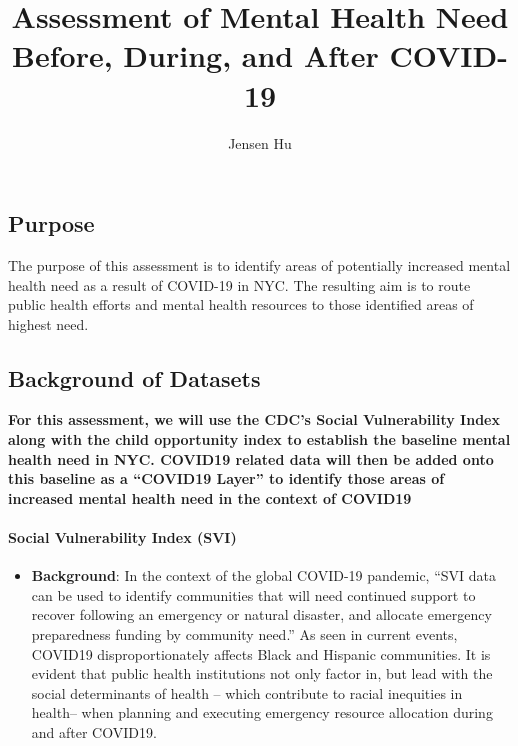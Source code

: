 \documentclass[
]{article}
\title{Assessment of Mental Health Need Before, During, and After COVID-19}
\author{Jensen Hu}
\date{}
\providecommand{\tightlist}{%
  \setlength{\itemsep}{0pt}\setlength{\parskip}{0pt}}
\begin{document}
\maketitle

\hypertarget{purpose}{%
\subsection{Purpose}\label{purpose}}

The purpose of this assessment is to identify areas of potentially
increased mental health need as a result of COVID-19 in NYC. The
resulting aim is to route public health efforts and mental health
resources to those identified areas of highest need.

\hypertarget{background-of-datasets}{%
\subsection{Background of Datasets}\label{background-of-datasets}}

\textbf{For this assessment, we will use the CDC's Social Vulnerability
Index along with the child opportunity index to establish the baseline
mental health need in NYC. COVID19 related data will then be added onto
this baseline as a ``COVID19 Layer'' to identify those areas of
increased mental health need in the context of COVID19}

\hypertarget{social-vulnerability-index-svi}{%
\paragraph{\texorpdfstring{\textbf{Social Vulnerability Index
(SVI)}}{Social Vulnerability Index (SVI)}}\label{social-vulnerability-index-svi}}

\begin{itemize}
\tightlist
\item
  \textbf{Background}: In the context of the global COVID-19 pandemic,
  ``SVI data can be used to identify communities that will need
  continued support to recover following an emergency or natural
  disaster, and allocate emergency preparedness funding by community
  need.'' As seen in current events, COVID19 disproportionately affects
  Black and Hispanic communities. It is evident that public health
  institutions not only factor in, but lead with the social determinants
  of health -- which contribute to racial inequities in health-- when
  planning and executing emergency resource allocation during and after
  COVID19.
\end{itemize}
\end{document}
